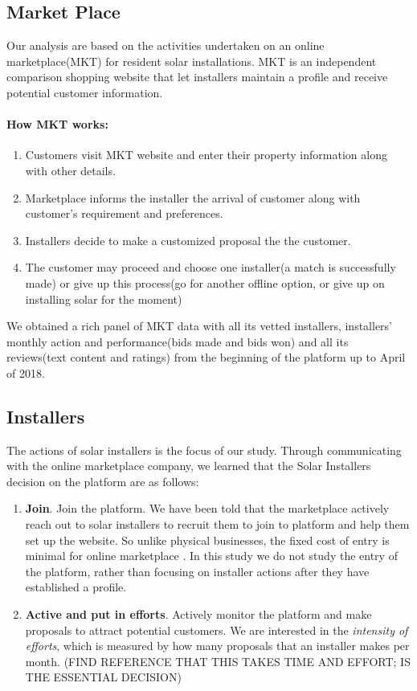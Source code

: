 \documentclass[msom,blindrev]{informs3}
\begin{document}
\subsection{Market Place}
Our analysis are based on the activities undertaken on an online marketplace(MKT) for resident solar installations. MKT is an independent comparison shopping website that let installers  maintain a profile and receive potential customer information. 
\paragraph{How MKT works:}
\begin{enumerate}
\item Customers visit MKT website and enter their property information along with other details.  
\item Marketplace informs the installer the arrival of customer along with customer's requirement and preferences. 
\item Installers decide to make a customized proposal the the customer. 
\item The customer may proceed and choose one installer(a match is successfully made) or give up this process(go for another offline option, or give up on installing solar for the moment) 
\end{enumerate}

We obtained a rich panel of MKT data with all its vetted installers, installers' monthly action and performance(bids made and bids won) and all its reviews(text content and ratings) from the beginning of the platform up to April of 2018. 

\subsection{Installers}
The actions of solar installers is the focus of our study. Through communicating with the online marketplace company, we learned that the Solar Installers decision on the platform are as follows: 

\begin{enumerate}
\item  \textbf{Join}. Join the platform. We have been told that the marketplace actively reach out to solar installers to recruit them to join to platform and help them set up the website. So unlike physical businesses, the fixed cost of entry is minimal for online marketplace \citep{haddad2015consumer}. In this study we do not study the entry of the platform, rather than focusing on installer actions after they have established a profile.  \\
\item  \textbf{Active and put in efforts}. Actively monitor the platform and make proposals to attract potential customers. We are interested in the\textit{ intensity of efforts}, which is measured by how many proposals that an installer makes per month. (FIND REFERENCE THAT THIS TAKES TIME AND EFFORT; IS THE ESSENTIAL DECISION)\\
\end{enumerate}
\end{document}
